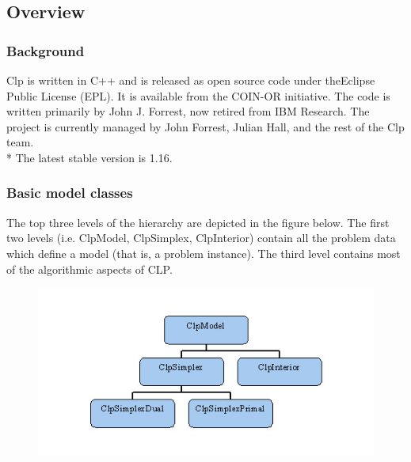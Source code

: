 \documentclass{beamer}
\begin{document}

\subsection{Overview}

\begin{frame}
\frametitle{Background}
Clp is written in C++ and is released as open source code under the ​Eclipse Public License (EPL). It is available from the ​COIN-OR initiative. The code is written primarily by John J. Forrest, now retired from IBM Research. The project is currently managed by John Forrest, ​Julian Hall, and the rest of the ​Clp team. \\*
The latest stable version is 1.16.
\end{frame}

\begin{frame}
 	\frametitle{Basic model classes}
  The top three levels of the hierarchy are depicted in the figure below. The first two levels (i.e. ClpModel, ClpSimplex, ClpInterior) contain all the problem data which define a model (that is, a problem instance). The third level contains most of the algorithmic aspects of CLP.
  \begin{figure}
  	\includegraphics[width=0.8\linewidth]{clpbasicmodelhier}
  \end{figure}
\end{frame}
\end{document}
